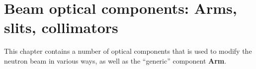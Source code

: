 
\chapter{Beam optical components:
Arms, slits, collimators}
This chapter contains a number of optical components
that is used to modify the neutron beam in various ways,
as well as the ``generic'' component {\bf Arm}.



\newpage


\newpage


\newpage


\newpage


\newpage


\newpage


\newpage


%

\newpage


\newpage

